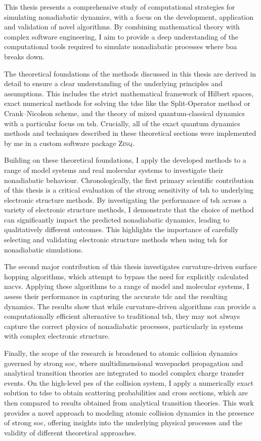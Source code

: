 This thesis presents a comprehensive study of computational strategies for simulating nonadiabatic dynamics, with a focus on the development, application and validation of novel algorithms. By combining mathematical theory with complex software engineering, I aim to provide a deep understanding of the computational tools required to simulate nonadiabatic processes where \gls{boa} breaks down.

The theoretical foundations of the methods discussed in this thesis are derived in detail to ensure a clear understanding of the underlying principles and assumptions. This includes the strict mathematical framework of Hilbert spaces, exact numerical methods for solving the \gls{tdse} like the Split-Operator method or Crank--Nicolson scheme, and the theory of mixed quantum-classical dynamics with a particular focus on \gls{tsh}. Crucially, all of the exact quantum dynamics methods and techniques described in these theoretical sections were implemented by me in a custom software package \textsc{Zinq}.\supercite{10.5281/zenodo.18386143}

Building on these theoretical foundations, I apply the developed methods to a range of model systems and real molecular systems to investigate their nonadiabatic behaviour. Chronologically, the first primary scientific contribution of this thesis is a critical evaluation of the strong sensitivity of \gls{tsh} to underlying electronic structure methods. By investigating the performance of \gls{tsh} across a variety of electronic structure methods, I demonstrate that the choice of method can significantly impact the predicted nonadiabatic dynamics, leading to qualitatively different outcomes. This highlights the importance of carefully selecting and validating electronic structure methods when using \gls{tsh} for nonadiabatic simulations.

The second major contribution of this thesis investigates curvature-driven surface hopping algorithms, which attempt to bypass the need for explicitly calculated \glspl{nacv}. Applying these algorithms to a range of model and molecular systems, I assess their performance in capturing the accurate \gls{tdc} and the resulting dynamics. The results show that while curvature-driven algorithms can provide a computationally efficient alternative to traditional \gls{tsh}, they may not always capture the correct physics of nonadiabatic processes, particularly in systems with complex electronic structure.

Finally, the scope of the research is broadened to atomic collision dynamics governed by strong \gls{soc}, where multidimensional wavepacket propagation and analytical transition theories are integrated to model complex charge transfer events. On the high-level \gls{pes} of the collision system, I apply a numerically exact solution to \gls{tdse} to obtain scattering probabilities and cross sections, which are then compared to results obtained from analytical transition theories. This work provides a novel approach to modeling atomic collision dynamics in the presence of strong \gls{soc}, offering insights into the underlying physical processes and the validity of different theoretical approaches.

